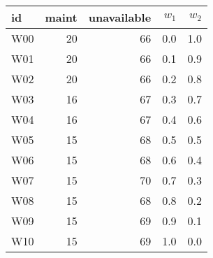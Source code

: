 \begin{tabular}{lrrrr}
\toprule
  id &  maint &  unavailable &  $w_1$ &  $w_2$ \\
\midrule
 W00 &     20 &           66 &    0.0 &    1.0 \\
 W01 &     20 &           66 &    0.1 &    0.9 \\
 W02 &     20 &           66 &    0.2 &    0.8 \\
 W03 &     16 &           67 &    0.3 &    0.7 \\
 W04 &     16 &           67 &    0.4 &    0.6 \\
 W05 &     15 &           68 &    0.5 &    0.5 \\
 W06 &     15 &           68 &    0.6 &    0.4 \\
 W07 &     15 &           70 &    0.7 &    0.3 \\
 W08 &     15 &           68 &    0.8 &    0.2 \\
 W09 &     15 &           69 &    0.9 &    0.1 \\
 W10 &     15 &           69 &    1.0 &    0.0 \\
\bottomrule
\end{tabular}
